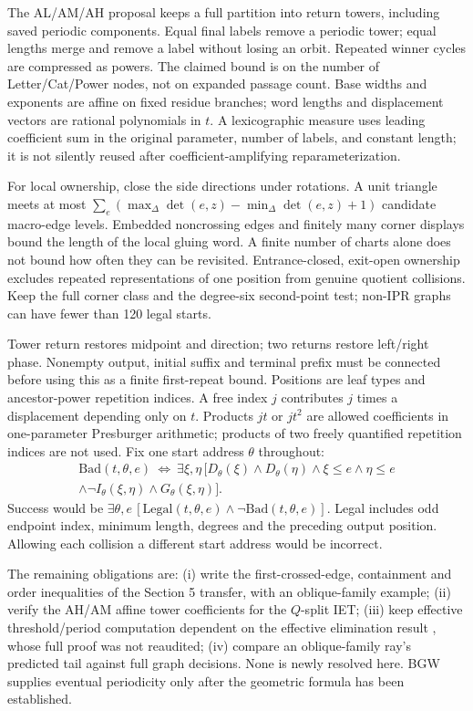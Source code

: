 \documentclass[11pt]{amsart}
\theoremstyle{definition}\newtheorem{definition}{Definition}
\begin{document}
The AL/AM/AH proposal keeps a full partition into return towers,
including saved periodic components. Equal final labels remove a
periodic tower; equal lengths merge and remove a label without losing
an orbit. Repeated winner cycles are compressed as powers. The claimed
bound is on the number of Letter/Cat/Power nodes, not on expanded
passage count. Base widths and exponents are affine on fixed residue
branches; word lengths and displacement vectors are rational
polynomials in $t$. A lexicographic measure uses leading coefficient
sum in the original parameter, number of labels, and constant length;
it is not silently reused after coefficient-amplifying reparameterization.

For local ownership, close the side directions under rotations. A
unit triangle meets at most
$\sum_e(\max_\Delta\det(e,z)-\min_\Delta\det(e,z)+1)$
candidate macro-edge levels. Embedded noncrossing edges and finitely
many corner displays bound the length of the local gluing word.
A finite number of charts alone does not bound how often they can
be revisited. Entrance-closed, exit-open ownership excludes repeated
representations of one position from genuine quotient collisions.
Keep the full corner class and the degree-six second-point test;
non-IPR graphs can have fewer than 120 legal starts.

Tower return restores midpoint and direction; two returns restore
left/right phase. Nonempty output, initial suffix and terminal prefix
must be connected before using this as a finite first-repeat bound.
Positions are leaf types and ancestor-power repetition indices.
A free index $j$ contributes $j$ times a displacement depending only
on $t$. Products $jt$ or $jt^2$ are allowed coefficients in one-parameter
Presburger arithmetic; products of two freely quantified repetition
indices are not used. Fix one start address $\theta$ throughout:
\[
\begin{split}
\mathrm{Bad}(t,\theta,e)\ \Longleftrightarrow\
\exists\xi,\eta\,[D_\theta(\xi)\wedge D_\theta(\eta)
\wedge\xi\le e\wedge\eta\le e\\
\wedge\neg I_\theta(\xi,\eta)\wedge G_\theta(\xi,\eta)].
\end{split}
\]
Success would be $\exists\theta,e\,[\mathrm{Legal}(t,\theta,e)
\wedge\neg\mathrm{Bad}(t,\theta,e)]$. Legal includes odd endpoint index,
minimum length, degrees and the preceding output position. Allowing
each collision a different start address would be incorrect.

The remaining obligations are: (i) write the first-crossed-edge,
containment and order inequalities of the Section 5 transfer, with an
oblique-family example; (ii) verify the AH/AM affine tower coefficients
for the $Q$-split IET; (iii) keep effective threshold/period computation
dependent on the effective elimination result \cite{QE}, whose full
proof was not reaudited; (iv) compare an oblique-family ray's predicted
tail against full graph decisions. None is newly resolved here.
BGW supplies eventual periodicity only after the geometric formula
has been established.
\end{document}
